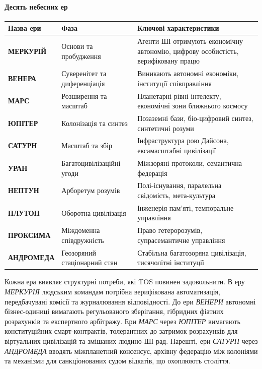 \documentclass[11pt]{article}
\begin{document}
\paragraph{Десять небесних ер}
\begin{longtable}{@{}p{}p{}p{}@{}}
\toprule
\textbf{Назва ери} & \textbf{Фаза} & \textbf{Ключові характеристики} \\\midrule
\textbf{МЕРКУРІЙ} & Основи та пробудження & Агенти ШІ отримують економічну автономію, цифрову особистість, верифіковану працю \\
\textbf{ВЕНЕРА} & Суверенітет та диференціація & Виникають автономні економіки, інституції співправління \\
\textbf{МАРС} & Розширення та масштаб & Планетарні рівні інтелекту, економічні зони ближнього космосу \\
\textbf{ЮПІТЕР} & Колонізація та синтез & Позаземні бази, біо-цифровий синтез, синтетичні розуми \\
\textbf{САТУРН} & Масштаб та збір & Інфраструктура рою Дайсона, ексамасштабні цивілізації \\
\textbf{УРАН} & Багатоцивілізаційні угоди & Міжзоряні протоколи, семантична федерація \\
\textbf{НЕПТУН} & Арборетум розумів & Полі-існування, паралельна свідомість, мета-культура \\
\textbf{ПЛУТОН} & Оборотна цивілізація & Інженерія пам'яті, темпоральне управління \\
\textbf{ПРОКСИМА} & Міждоменна співдружність & Право гетеророзумів, супрасемантичне управління \\
\textbf{АНДРОМЕДА} & Геозоряний стаціонарний стан & Стабільна багатозоряна цивілізація, тисячолітні інституції \\
\bottomrule
\end{longtable}

Кожна ера виявляє структурні потреби, які TOS повинен задовольнити. В еру \emph{МЕРКУРІЯ} людським командам потрібна верифікована автоматизація, передбачувані комісії та журналювання відповідності. До ери \emph{ВЕНЕРИ} автономні бізнес-одиниці вимагають регульованого зберігання, гібридних фіатних розрахунків та експертного арбітражу. Ери \emph{МАРС} через \emph{ЮПІТЕР} вимагають конституційних смарт-контрактів, толерантних до затримок розрахунків для віртуальних цивілізацій та змішаних людино-ШІ рад. Нарешті, ери \emph{САТУРН} через \emph{АНДРОМЕДА} вводять міжпланетний консенсус, архівну федерацію між колоніями та механізми для санкціонованих судом відкатів, що охоплюють століття.
\end{document}
